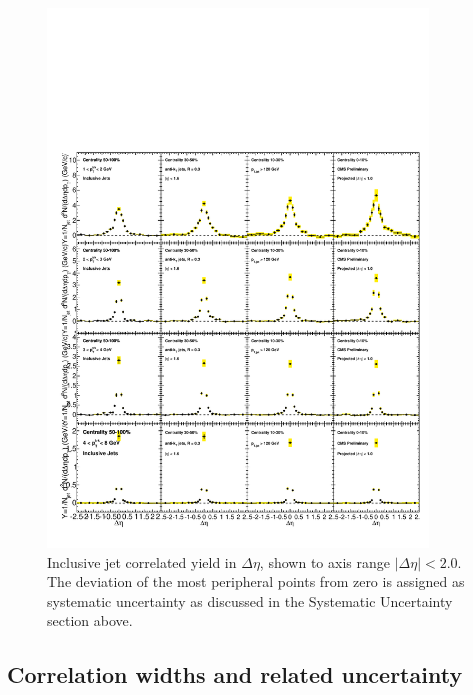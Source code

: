 \begin{figure}[h!]
\begin{center}
\includegraphics[width=0.9\textwidth]{figures/Appendices/Yield_Eta_wide_PbPb_Inclusive.pdf}
\caption[Background subtraction uncertainty determination]{Inclusive jet correlated yield in $\Delta\eta$, shown to axis range $|\Delta\eta|<2.0$.  The deviation of the most peripheral points from zero is assigned as systematic uncertainty as discussed in the Systematic Uncertainty section above.}
\label{fig:bkg_err}
\end{center}
\end{figure}
\clearpage



\subsection{Correlation widths and related uncertainty}

\label{app:width_determination}

